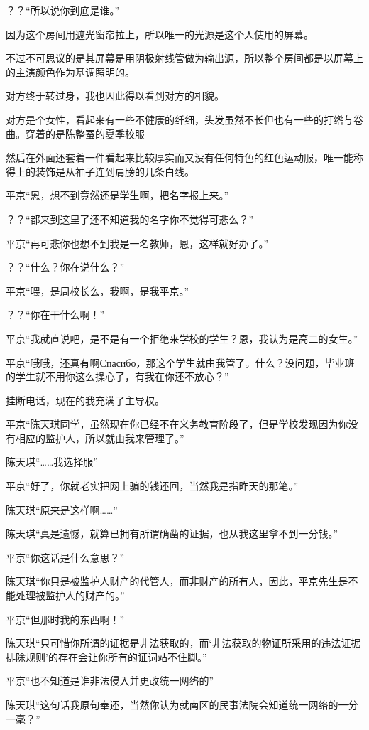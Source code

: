 ？？“所以说你到底是谁。”

因为这个房间用遮光窗帘拉上，所以唯一的光源是这个人使用的屏幕。

不过不可思议的是其屏幕是用阴极射线管做为输出源，所以整个房间都是以屏幕上的主演颜色作为基调照明的。

对方终于转过身，我也因此得以看到对方的相貌。

对方是个女性，看起来有一些不健康的纤细，头发虽然不长但也有一些的打绺与卷曲。穿着的是陈整蚕的夏季校服

然后在外面还套着一件看起来比较厚实而又没有任何特色的红色运动服，唯一能称得上的装饰是从袖子连到肩膀的几条白线。

平京“恩，想不到竟然还是学生啊，把名字报上来。”

？？“都来到这里了还不知道我的名字你不觉得可悲么？”

平京“再可悲你也想不到我是一名教师，恩，这样就好办了。”

？？“什么？你在说什么？”

平京“喂，是周校长么，我啊，是我平京。”

？？“你在干什么啊！”

平京“我就直说吧，是不是有一个拒绝来学校的学生？恩，我认为是高二的女生。”

平京“哦哦，还真有啊Спасибо，那这个学生就由我管了。什么？没问题，毕业班的学生就不用你这么操心了，有我在你还不放心？”

挂断电话，现在的我充满了主导权。

平京“陈天琪同学，虽然现在你已经不在义务教育阶段了，但是学校发现因为你没有相应的监护人，所以就由我来管理了。”

陈天琪“……我选择服”

平京“好了，你就老实把网上骗的钱还回，当然我是指昨天的那笔。”

陈天琪“原来是这样啊……”

陈天琪“真是遗憾，就算已拥有所谓确凿的证据，也从我这里拿不到一分钱。”

平京“你这话是什么意思？”

陈天琪“你只是被监护人财产的代管人，而非财产的所有人，因此，平京先生是不能处理被监护人的财产的。”

平京“但那时我的东西啊！”

陈天琪“只可惜你所谓的证据是非法获取的，而‘非法获取的物证所采用的违法证据排除规则’的存在会让你所有的证词站不住脚。”

平京“也不知道是谁非法侵入并更改统一网络的”

陈天琪“这句话我原句奉还，当然你认为就南区的民事法院会知道统一网络的一分一毫？”


